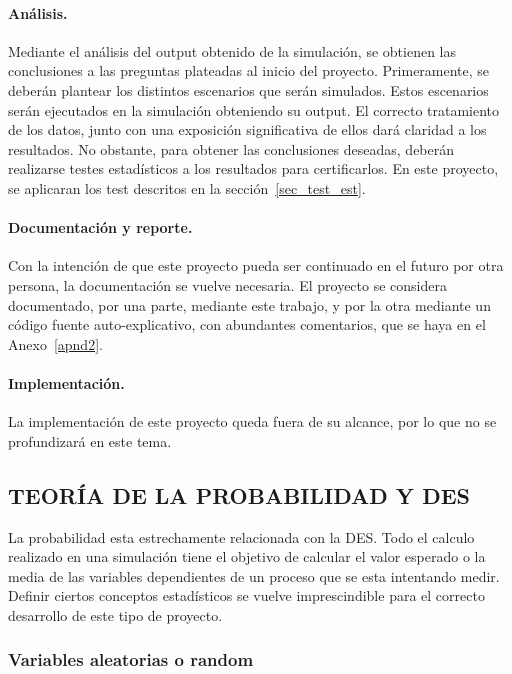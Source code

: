\paragraph{Análisis.}

Mediante el análisis del output obtenido de la simulación,
se obtienen las conclusiones a las preguntas plateadas al inicio del proyecto.
Primeramente, se deberán plantear los distintos escenarios que serán simulados.
Estos escenarios serán ejecutados en la simulación obteniendo su output.
El correcto tratamiento de los datos, junto con una exposición significativa de ellos dará claridad a los resultados.
No obstante, para obtener las conclusiones deseadas, deberán realizarse testes estadísticos a los resultados para certificarlos.
En este proyecto, se aplicaran los test descritos en la sección~\ref{sec_test_est}.

\paragraph{Documentación y reporte.}

Con la intención de que este proyecto
pueda ser continuado en el futuro por otra persona,
la documentación se vuelve necesaria.
El proyecto se considera documentado,
por una parte, mediante este trabajo,
y por la otra mediante un código fuente auto-explicativo,
con abundantes comentarios, que se haya en el Anexo~\ref{apnd2}.

\paragraph{Implementación.}

La implementación de este proyecto queda fuera de su alcance, por lo que no se profundizará en este tema.

\subsection{TEORÍA DE LA PROBABILIDAD Y DES}

La probabilidad esta estrechamente relacionada con la DES.
Todo el calculo realizado en una simulación tiene el objetivo de
calcular el valor esperado o la media
de las variables dependientes de un proceso que se esta intentando medir.
Definir ciertos conceptos estadísticos se vuelve imprescindible
para el correcto desarrollo de este tipo de proyecto.

\subsubsection{Variables aleatorias o random}

